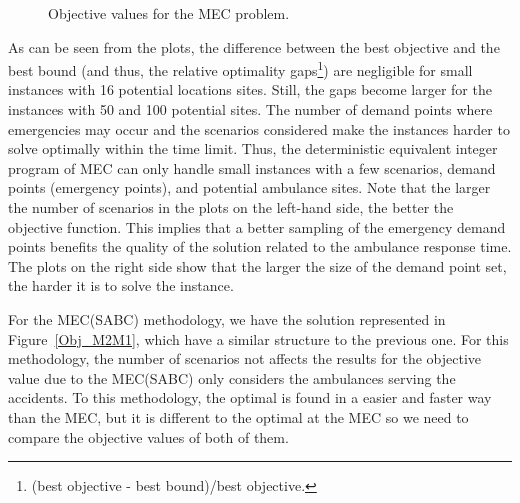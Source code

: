 \begin{figure}[H]
\hspace{0.4cm}%
\vspace{0.4cm}
\caption{Objective values for the MEC problem.}
\label{Obj_MEC}
\end{figure}

As can be seen from the plots, the difference between the best objective and the best bound (and thus, the relative optimality gaps\footnote{(best objective -  best bound)/best objective.}) are negligible for small instances with 16 potential locations sites. Still, the gaps become larger for the instances with 50 and 100 potential sites. The number of demand points where emergencies may occur and the scenarios considered make the instances harder to solve optimally within the time limit. Thus, the deterministic equivalent integer program of MEC can only handle small instances with a few scenarios, demand points (emergency points), and potential ambulance sites. Note that the larger the number of scenarios in the plots on the left-hand side, the better the objective function. This implies that a better sampling of the emergency demand points benefits the quality of the solution related to the ambulance response time. The plots on the right side show that the larger the size of the demand point set, the harder it is to solve the instance. 

   

For the MEC(SABC) methodology, we have the solution represented in Figure~\ref{Obj_M2M1}, which have a similar structure to the previous one. For this methodology, the number of scenarios not affects the results for the objective value due to the MEC(SABC) only considers the ambulances serving the accidents. To this me\-tho\-do\-lo\-gy, the optimal is found in a easier and faster way than the MEC, but it is different to the optimal at the MEC so we need to compare the objective values of both of them. 

